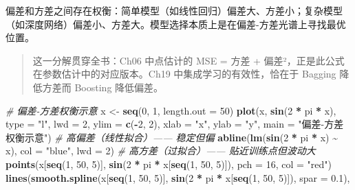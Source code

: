 \documentclass[
]{book}
\newenvironment{Shaded}{\begin{snugshade}}{\end{snugshade}}
\newcommand{\AttributeTok}[1]{\textcolor[rgb]{0.13,0.29,0.53}{#1}}
\newcommand{\CommentTok}[1]{\textcolor[rgb]{0.56,0.35,0.01}{\textit{#1}}}
\newcommand{\DecValTok}[1]{\textcolor[rgb]{0.00,0.00,0.81}{#1}}
\newcommand{\FloatTok}[1]{\textcolor[rgb]{0.00,0.00,0.81}{#1}}
\newcommand{\FunctionTok}[1]{\textcolor[rgb]{0.13,0.29,0.53}{\textbf{#1}}}
\newcommand{\NormalTok}[1]{#1}
\newcommand{\OtherTok}[1]{\textcolor[rgb]{0.56,0.35,0.01}{#1}}
\newcommand{\SpecialCharTok}[1]{\textcolor[rgb]{0.81,0.36,0.00}{\textbf{#1}}}
\newcommand{\StringTok}[1]{\textcolor[rgb]{0.31,0.60,0.02}{#1}}
\begin{document}
偏差和方差之间存在权衡：简单模型（如线性回归）偏差大、方差小；复杂模型（如深度网络）偏差小、方差大。模型选择本质上是在偏差-方差光谱上寻找最优位置。

\begin{quote}
这一分解贯穿全书：Ch06 中点估计的 MSE = 方差 + 偏差²，正是此公式在参数估计中的对应版本。Ch19 中集成学习的有效性，恰在于 Bagging 降低方差而 Boosting 降低偏差。
\end{quote}

\begin{Shaded}
\begin{Highlighting}[]
\CommentTok{\# 偏差{-}方差权衡示意}
\NormalTok{x }\OtherTok{\textless{}{-}} \FunctionTok{seq}\NormalTok{(}\DecValTok{0}\NormalTok{, }\DecValTok{1}\NormalTok{, }\AttributeTok{length.out =} \DecValTok{50}\NormalTok{)}
\FunctionTok{plot}\NormalTok{(x, }\FunctionTok{sin}\NormalTok{(}\DecValTok{2} \SpecialCharTok{*}\NormalTok{ pi }\SpecialCharTok{*}\NormalTok{ x), }\AttributeTok{type =} \StringTok{"l"}\NormalTok{, }\AttributeTok{lwd =} \DecValTok{2}\NormalTok{, }\AttributeTok{ylim =} \FunctionTok{c}\NormalTok{(}\SpecialCharTok{{-}}\DecValTok{2}\NormalTok{, }\DecValTok{2}\NormalTok{),}
     \AttributeTok{xlab =} \StringTok{"x"}\NormalTok{, }\AttributeTok{ylab =} \StringTok{"y"}\NormalTok{, }\AttributeTok{main =} \StringTok{"偏差{-}方差权衡示意"}\NormalTok{)}
\CommentTok{\# 高偏差（线性拟合）—— 稳定但偏}
\FunctionTok{abline}\NormalTok{(}\FunctionTok{lm}\NormalTok{(}\FunctionTok{sin}\NormalTok{(}\DecValTok{2} \SpecialCharTok{*}\NormalTok{ pi }\SpecialCharTok{*}\NormalTok{ x) }\SpecialCharTok{\textasciitilde{}}\NormalTok{ x), }\AttributeTok{col =} \StringTok{"blue"}\NormalTok{, }\AttributeTok{lwd =} \DecValTok{2}\NormalTok{)}
\CommentTok{\# 高方差（过拟合）—— 贴近训练点但波动大}
\FunctionTok{points}\NormalTok{(x[}\FunctionTok{seq}\NormalTok{(}\DecValTok{1}\NormalTok{, }\DecValTok{50}\NormalTok{, }\DecValTok{5}\NormalTok{)], }\FunctionTok{sin}\NormalTok{(}\DecValTok{2} \SpecialCharTok{*}\NormalTok{ pi }\SpecialCharTok{*}\NormalTok{ x[}\FunctionTok{seq}\NormalTok{(}\DecValTok{1}\NormalTok{, }\DecValTok{50}\NormalTok{, }\DecValTok{5}\NormalTok{)]), }\AttributeTok{pch =} \DecValTok{16}\NormalTok{, }\AttributeTok{col =} \StringTok{"red"}\NormalTok{)}
\FunctionTok{lines}\NormalTok{(}\FunctionTok{smooth.spline}\NormalTok{(x[}\FunctionTok{seq}\NormalTok{(}\DecValTok{1}\NormalTok{, }\DecValTok{50}\NormalTok{, }\DecValTok{5}\NormalTok{)], }\FunctionTok{sin}\NormalTok{(}\DecValTok{2} \SpecialCharTok{*}\NormalTok{ pi }\SpecialCharTok{*}\NormalTok{ x[}\FunctionTok{seq}\NormalTok{(}\DecValTok{1}\NormalTok{, }\DecValTok{50}\NormalTok{, }\DecValTok{5}\NormalTok{)]), }\AttributeTok{spar =} \FloatTok{0.1}\NormalTok{),}

\end{Highlighting}
\end{Shaded}
\end{document}
